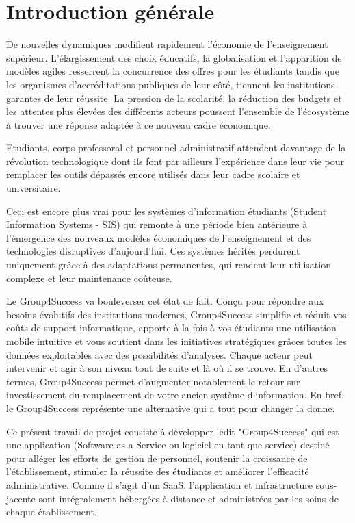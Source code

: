 \chapter*{Introduction générale}
De nouvelles dynamiques modifient rapidement l'économie de l'enseignement supérieur. L'élargissement des choix éducatifs, la globalisation et l'apparition de modèles agiles resserrent la concurrence des offres pour les
étudiants tandis que les organismes d'accréditations publiques de leur côté,
tiennent les institutions garantes de leur réussite. La pression de la scolarité,
la réduction des budgets et les attentes plus élevées des différents acteurs
poussent l'ensemble de l'écosystème à trouver une réponse adaptée à ce
nouveau cadre économique.
\medskip

Etudiants, corps professoral et personnel administratif attendent davantage de la révolution
technologique dont ils font par ailleurs l'expérience dans leur vie pour remplacer les outils 
dépassés encore utilisés dans leur cadre scolaire et universitaire.
\medskip

Ceci est encore plus vrai pour les systèmes d'information étudiants (Student Information Systems - SIS) qui remonte à une période bien antérieure à l'émergence des nouveaux modèles économiques de l'enseignement et des technologies disruptives d'aujourd'hui. Ces systèmes hérités perdurent uniquement grâce à des adaptations permanentes, qui rendent leur utilisation complexe et leur maintenance coûteuse.
\medskip

Le Group4Success va bouleverser cet état de fait. Conçu pour répondre aux besoins évolutifs des institutions modernes, Group4Success simplifie et réduit vos coûts de support informatique, apporte à la fois à vos étudiants une utilisation mobile intuitive et vous soutient dans les initiatives stratégiques grâces  toutes les données exploitables avec des possibilités d'analyses. Chaque acteur peut intervenir et agir à son niveau tout de suite et là où il se trouve. En d'autres termes, Group4Success permet d'augmenter notablement le retour sur investissement du remplacement de votre ancien système d'information. En bref, le Group4Success représente une alternative qui a tout pour changer la donne.
\medskip

Ce présent travail de projet consiste à développer ledit "Group4Success" qui est une application  (Software as a Service ou logiciel en tant que service) destiné pour alléger les efforts de gestion de personnel, soutenir la croissance de l'établissement, stimuler la réussite des étudiants et améliorer l'efficacité administrative. Comme il s'agit d'un SaaS, l'application et infrastructure sous-jacente sont intégralement hébergées à distance et administrées par les soins de chaque établissement.
\medskip

